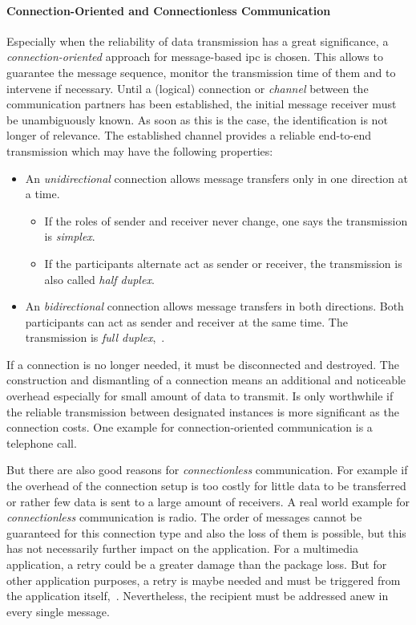 \paragraph{Connection-Oriented and Connectionless Communication}
Especially when the reliability of data transmission has a great significance, a \textit{connection-oriented} approach for message-based \ac{ipc} is chosen.
This allows to guarantee the message sequence, monitor the transmission time of them and to intervene if necessary\cite{glatz2015betriebssysteme}.
Until a (logical) connection or \textit{channel} between the communication partners has been established, the initial message receiver must be unambiguously known.
As soon as this is the case, the identification is not longer of relevance.
The established channel provides a reliable end-to-end transmission which may have the following properties:
%
\begin{itemize}
    \item An \textit{unidirectional} connection allows message transfers only in one direction at a time. 
        \begin{itemize}
            \item If the roles of sender and receiver never change, one says the transmission is \textit{simplex}.
            \item If the participants alternate act as sender or receiver, the transmission is also called \textit{half duplex}.
        \end{itemize}
    \item An \textit{bidirectional} connection allows message transfers in both directions. Both participants can act as sender and receiver at the same time. The transmission is \textit{full duplex}\cite{brause2017betriebssysteme},~\cite{glatz2015betriebssysteme}.
\end{itemize}
%
If a connection is no longer needed, it must be disconnected and destroyed.
The construction and dismantling of a connection means an additional and noticeable overhead especially for small amount of data to transmit.
Is only worthwhile if the reliable transmission between designated instances is more significant as the connection costs\cite{glatz2015betriebssysteme}.
One example for connection-oriented communication is a telephone call.

But there are also good reasons for \textit{connectionless} communication.
For example if the overhead of the connection setup is too costly for little data to be transferred or rather few data is sent to a large amount of receivers.
A real world example for \textit{connectionless} communication is radio.
The order of messages cannot be guaranteed for this connection type and also the loss of them is possible, but this has not necessarily further impact on the application.
For a multimedia application, a retry could be a greater damage than the package loss.
But for other application purposes, a retry is maybe needed and must be triggered from the application itself\cite{glatz2015betriebssysteme},~\cite{brause2017betriebssysteme}.
Nevertheless, the recipient must be addressed anew in every single message.

